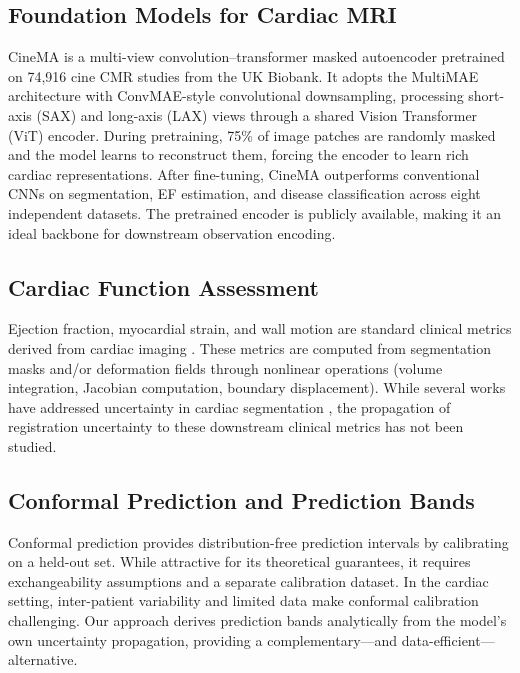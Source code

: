 \documentclass[10pt,twocolumn]{article}
\begin{document}
\subsection{Foundation Models for Cardiac MRI}

CineMA \cite{fu2025cinema} is a multi-view convolution--transformer masked autoencoder pretrained on 74,916 cine CMR studies from the UK Biobank. It adopts the MultiMAE architecture \cite{multimae} with ConvMAE-style \cite{convmae} convolutional downsampling, processing short-axis (SAX) and long-axis (LAX) views through a shared Vision Transformer (ViT) encoder. During pretraining, 75\% of image patches are randomly masked and the model learns to reconstruct them, forcing the encoder to learn rich cardiac representations. After fine-tuning, CineMA outperforms conventional CNNs on segmentation, EF estimation, and disease classification across eight independent datasets. The pretrained encoder is publicly available, making it an ideal backbone for downstream observation encoding.

\subsection{Cardiac Function Assessment}

Ejection fraction, myocardial strain, and wall motion are standard clinical metrics derived from cardiac imaging \cite{qin2018joint,qin2020biomechanics}. These metrics are computed from segmentation masks and/or deformation fields through nonlinear operations (volume integration, Jacobian computation, boundary displacement). While several works have addressed uncertainty in cardiac segmentation \cite{baumgartner2019phiseg}, the propagation of registration uncertainty to these downstream clinical metrics has not been studied.

\subsection{Conformal Prediction and Prediction Bands}

Conformal prediction \cite{vovk2005algorithmic} provides distribution-free prediction intervals by calibrating on a held-out set. While attractive for its theoretical guarantees, it requires exchangeability assumptions and a separate calibration dataset. In the cardiac setting, inter-patient variability and limited data make conformal calibration challenging. Our approach derives prediction bands analytically from the model's own uncertainty propagation, providing a complementary---and data-efficient---alternative.
\end{document}
